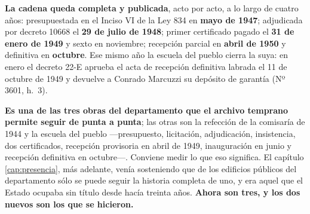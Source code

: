 \begin{cautela}
\textbf{La cadena queda completa y publicada}, acto por acto, a lo largo de cuatro años:
presupuestada en el Inciso VI de la Ley 834 en \textbf{mayo de 1947}; adjudicada por decreto
10668 el \textbf{29 de julio de 1948}; primer certificado pagado el \textbf{31 de enero de
1949} y sexto en noviembre; recepción parcial en \textbf{abril de 1950} y definitiva en
\textbf{octubre}. Ese mismo año la escuela del pueblo cierra la suya: en enero el decreto 22-E
aprueba el acta de recepción definitiva labrada el 11 de octubre de 1949 y devuelve a Conrado
Marcuzzi su depósito de garantía (Nº 3601, h.\ 3).

\textbf{Es una de las tres obras del departamento que el archivo temprano permite seguir de punta a
punta}; las otras son la refección de la comisaría de 1944 y la escuela del pueblo ---presupuesto,
licitación, adjudicación, insistencia, dos certificados, recepción provisoria en abril de 1949,
inauguración en junio y recepción definitiva en octubre---. Conviene medir lo que
eso significa. El capítulo \ref{cap:presencia}, más adelante, venía sosteniendo que de los edificios públicos del
departamento sólo se puede seguir la historia completa de uno, y era aquel que el Estado ocupaba sin
título desde hacía treinta años. \textbf{Ahora son tres, y los dos nuevos son los que se hicieron.}


\end{cautela}
